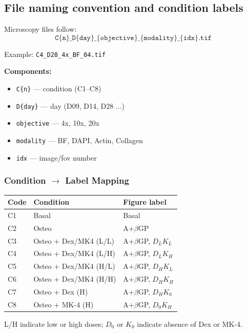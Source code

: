 \documentclass[11pt,a4paper]{article}
\begin{document}
\newpage

\subsection{File naming convention and condition labels}

Microscopy files follow:
\[
\texttt{C\{n\}\_D\{day\}\_\{objective\}\_\{modality\}\_\{idx\}.tif}
\]

Example:
\texttt{C4\_D28\_4x\_BF\_04.tif}

\noindent\textbf{Components:}
\begin{itemize}
    \item \texttt{C\{n\}} — condition (C1--C8)
    \item \texttt{D\{day\}} — day (D09, D14, D28 ...)
    \item \texttt{objective} — 4x, 10x, 20x
    \item \texttt{modality} — BF, DAPI, Actin, Collagen
    \item \texttt{idx} — image/fov number
\end{itemize}

\subsubsection*{Condition $\rightarrow$ Label Mapping}

\begin{table}[htbp]
\centering
\renewcommand{\arraystretch}{1.1}
\setlength{\tabcolsep}{8pt}
\begin{tabular}{@{}l l l@{}}
\toprule
\textbf{Code} & \textbf{Condition} & \textbf{Figure label} \\
\midrule
C1 & Basal & Basal \\
C2 & Osteo & A+$\beta$GP \\
C3 & Osteo + Dex/MK4 (L/L) & A+$\beta$GP, $D_LK_L$ \\
C4 & Osteo + Dex/MK4 (L/H) & A+$\beta$GP, $D_LK_H$ \\
C5 & Osteo + Dex/MK4 (H/L) & A+$\beta$GP, $D_HK_L$ \\
C6 & Osteo + Dex/MK4 (H/H) & A+$\beta$GP, $D_HK_H$ \\
C7 & Osteo + Dex (H) & A+$\beta$GP, $D_HK_0$ \\
C8 & Osteo + MK-4 (H) & A+$\beta$GP, $D_0K_H$ \\
\bottomrule
\end{tabular}
\end{table}

\noindent
L/H indicate low or high doses; $D_0$ or $K_0$ indicate absence of Dex or MK-4.
\end{document}
